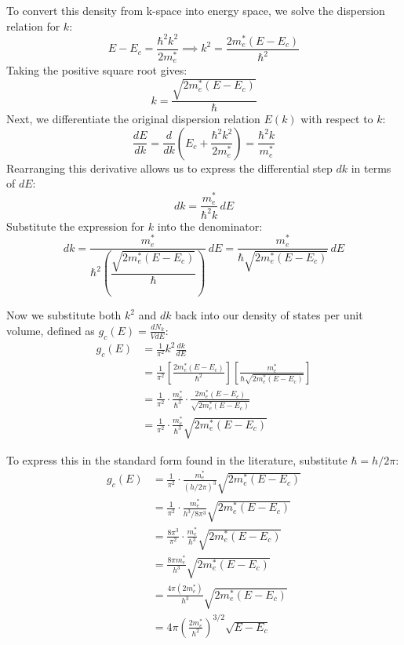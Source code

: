 To convert this density from k-space into energy space, we solve the dispersion relation for $k$:
\begin{equation*}
    E - E_c = \frac{\hbar^2 k^2}{2m^*_e} \implies k^2 = \frac{2m^*_e(E-E_c)}{\hbar^2}
\end{equation*}
Taking the positive square root gives:
\begin{equation*}
    k = \frac{\sqrt{2m^*_e(E-E_c)}}{\hbar}
\end{equation*}
Next, we differentiate the original dispersion relation $E(k)$ with respect to $k$:
\begin{equation*}
    \frac{dE}{dk} = \frac{d}{dk}\left(E_c + \frac{\hbar^2 k^2}{2m^*_e}\right) = \frac{\hbar^2 k}{m^*_e}
\end{equation*}
Rearranging this derivative allows us to express the differential step $dk$ in terms of $dE$:
\begin{equation*}
    dk = \frac{m^*_e}{\hbar^2 k}\,dE
\end{equation*}
Substitute the expression for $k$ into the denominator:
\begin{equation*}
    dk = \frac{m^*_e}{\hbar^2 \left(\dfrac{\sqrt{2m^*_e(E-E_c)}}{\hbar}\right)}\,dE = \frac{m^*_e}{\hbar \sqrt{2m^*_e(E-E_c)}}\,dE
\end{equation*}

Now we substitute both $k^2$ and $dk$ back into our density of states per unit volume, defined as $g_c(E) = \frac{dN_k}{V dE}$:
\begin{align*}
    g_c(E) & = \frac{1}{\pi^2} k^2 \frac{dk}{dE}                                                                                    \\
           & = \frac{1}{\pi^2} \left[ \frac{2m^*_e(E-E_c)}{\hbar^2} \right] \left[ \frac{m^*_e}{\hbar \sqrt{2m^*_e(E-E_c)}} \right] \\
           & = \frac{1}{\pi^2} \cdot \frac{m^*_e}{\hbar^3} \cdot \frac{2m^*_e(E-E_c)}{\sqrt{2m^*_e(E-E_c)}}                         \\
           & = \frac{1}{\pi^2} \cdot \frac{m^*_e}{\hbar^3} \sqrt{2m^*_e(E-E_c)}
\end{align*}

To express this in the standard form found in the literature, substitute $\hbar = h/2\pi$:
\begin{align*}
    g_c(E) & = \frac{1}{\pi^2} \cdot \frac{m^*_e}{(h/2\pi)^3} \sqrt{2m^*_e(E-E_c)}   \\
           & = \frac{1}{\pi^2} \cdot \frac{m^*_e}{h^3 / 8\pi^3} \sqrt{2m^*_e(E-E_c)} \\
           & = \frac{8\pi^3}{\pi^2} \cdot \frac{m^*_e}{h^3} \sqrt{2m^*_e(E-E_c)}     \\
           & = \frac{8\pi m^*_e}{h^3} \sqrt{2m^*_e(E-E_c)}                           \\
           & = \frac{4\pi (2m^*_e)}{h^3} \sqrt{2m^*_e(E-E_c)}                        \\
           & = 4\pi \left(\frac{2m^*_e}{h^2}\right)^{3/2} \sqrt{E-E_c}
\end{align*}

